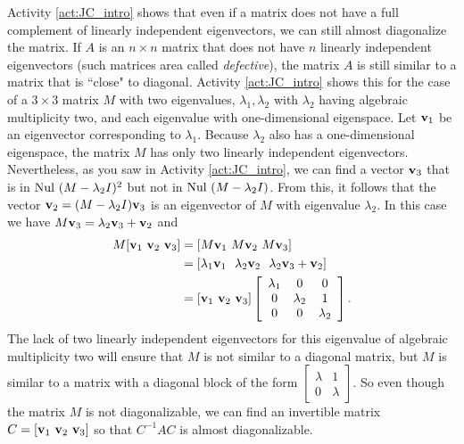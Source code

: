Activity \ref{act:JC_intro} shows that even if a matrix does not have a full complement of linearly independent eigenvectors, we can still almost diagonalize the matrix. If $A$ is an $n \times n$ matrix that does not have $n$ linearly independent eigenvectors (such matrices area called \emph{defective}), the matrix $A$ is still similar to a matrix that is ``close" to diagonal. Activity \ref{act:JC_intro} shows this for the case of a $3 \times 3$ matrix $M$ with two eigenvalues, $\lambda_1, \lambda_2$ with $\lambda_2$ having algebraic multiplicity two, and each eigenvalue with one-dimensional eigenspace. Let $\mathbf{v}_1$ be an eigenvector corresponding to $\lambda_1$. Because $\lambda_2$ also has a one-dimensional eigenspace, the matrix $M$ has only two linearly independent eigenvectors. Nevertheless, as you saw in Activity \ref{act:JC_intro}, we can find a vector $\mathbf{v}_3$ that is in $\text{Nul } (M - \lambda_2 I)^2$ but not in $\text{Nul } (M-\lambda_2 I)$. From this, it follows that the vector $\mathbf{v}_2 = (M - \lambda_2 I) \mathbf{v}_3$ is an eigenvector of $M$ with eigenvalue $\lambda_2$. In this case we have $M \mathbf{v}_3 = \lambda_2 \mathbf{v}_3 + \mathbf{v}_2$ and 
\begin{align*}
M [\mathbf{v}_1 \ \mathbf{v}_2 \ \mathbf{v}_3] &= [M\mathbf{v}_1 \ M\mathbf{v}_2 \ M\mathbf{v}_3] \\
	&= [\lambda_1 \mathbf{v}_1 \, \ \, \lambda_2 \mathbf{v}_2 \, \ \, \lambda_2 \mathbf{v}_3+\mathbf{v}_2 ] \\
	&= [\mathbf{v}_1  \  \mathbf{v}_2 \ \mathbf{v}_3]  \left[ \begin{array}{ccc} \lambda_1 &0 & 0  \\ 0 & \lambda_2 & 1 \\ 0 & 0 & \lambda_2 \end{array} \right].
\end{align*}
The lack of two linearly independent eigenvectors for this eigenvalue of algebraic multiplicity two will ensure that $M$ is not similar to a diagonal matrix, but $M$ is similar to a matrix with a diagonal block of the form $\left[ \begin{array}{cc} \lambda &1 \\ 0 & \lambda \end{array} \right]$. So even though the matrix $M$ is not diagonalizable, we can find an invertible matrix $C = [\mathbf{v}_1 \ \mathbf{v}_2 \ \mathbf{v}_3]$ so that $C^{-1}AC$ is almost diagonalizable. 

